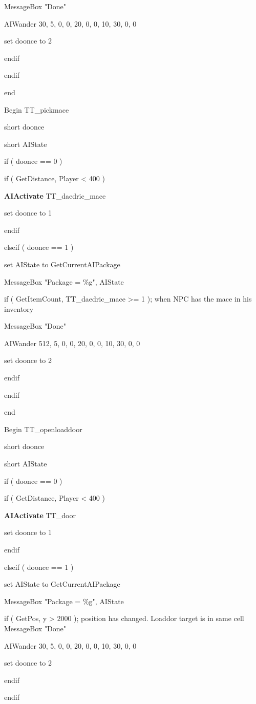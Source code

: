 \documentclass[
]{article}
\begin{document}
MessageBox "Done"

AIWander 30, 5, 0, 0, 20, 0, 0, 10, 30, 0, 0

set doonce to 2

endif

endif

end

Begin TT\_pickmace

short doonce

short AIState

if ( doonce == 0 )

if ( GetDistance, Player \textless{} 400 )

\textbf{AIActivate} TT\_daedric\_mace

set doonce to 1

endif

elseif ( doonce == 1 )

set AIState to GetCurrentAIPackage

MessageBox "Package = \%g", AIState

if ( GetItemCount, TT\_daedric\_mace \textgreater= 1 ); when NPC has the
mace in his inventory

MessageBox "Done"

AIWander 512, 5, 0, 0, 20, 0, 0, 10, 30, 0, 0

set doonce to 2

endif

endif

end

Begin TT\_openloaddoor

short doonce

short AIState

if ( doonce == 0 )

if ( GetDistance, Player \textless{} 400 )

\textbf{AIActivate} TT\_door

set doonce to 1

endif

elseif ( doonce == 1 )

set AIState to GetCurrentAIPackage

MessageBox "Package = \%g", AIState

if ( GetPos, y \textgreater{} 2000 ); position has changed. Loaddor
target is in same cell MessageBox "Done"

AIWander 30, 5, 0, 0, 20, 0, 0, 10, 30, 0, 0

set doonce to 2

endif

endif
\end{document}

